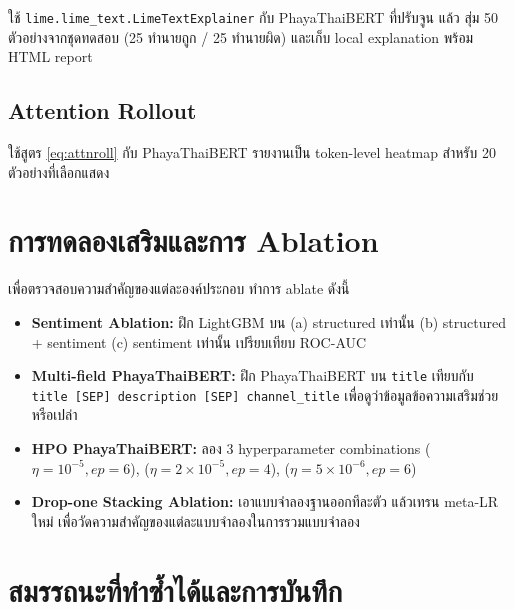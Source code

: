 ใช้ \texttt{lime.lime\_text.LimeTextExplainer} กับ PhayaThaiBERT ที่ปรับจูน
แล้ว สุ่ม 50 ตัวอย่างจากชุดทดสอบ (25 ทำนายถูก / 25 ทำนายผิด) และเก็บ
local explanation พร้อม HTML report

\subsection{Attention Rollout}

ใช้สูตร \eqref{eq:attnroll} กับ PhayaThaiBERT รายงานเป็น token-level
heatmap สำหรับ 20 ตัวอย่างที่เลือกแสดง

\section{การทดลองเสริมและการ Ablation}
\label{sec:method-ablation}

เพื่อตรวจสอบความสำคัญของแต่ละองค์ประกอบ ทำการ ablate ดังนี้

\begin{itemize}[leftmargin=2em]
  \item \textbf{Sentiment Ablation:} ฝึก LightGBM บน (a) structured
        เท่านั้น (b) structured + sentiment (c) sentiment เท่านั้น
        เปรียบเทียบ ROC-AUC
  \item \textbf{Multi-field PhayaThaiBERT:} ฝึก PhayaThaiBERT บน
        \texttt{title} เทียบกับ \texttt{title [SEP] description [SEP] channel\_title}
        เพื่อดูว่าข้อมูลข้อความเสริมช่วยหรือเปล่า
  \item \textbf{HPO PhayaThaiBERT:} ลอง 3 hyperparameter combinations
        ($\eta = 10^{-5}, ep = 6$), ($\eta = 2\!\times\!10^{-5}, ep = 4$),
        ($\eta = 5\!\times\!10^{-6}, ep = 6$)
  \item \textbf{Drop-one Stacking Ablation:} เอาแบบจำลองฐานออกทีละตัว
        แล้วเทรน meta-LR ใหม่ เพื่อวัดความสำคัญของแต่ละแบบจำลองในการรวมแบบจำลอง
\end{itemize}

\section{สมรรถนะที่ทำซ้ำได้และการบันทึก}
\label{sec:method-repro}

